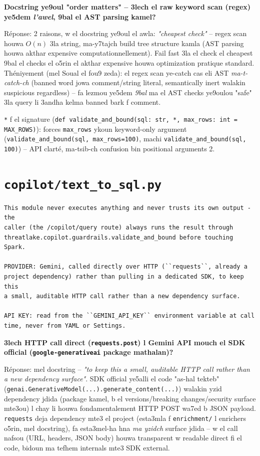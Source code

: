 \documentclass[11pt,a4paper]{report}
\DeclareRobustCommand{\code}[1]{\texttt{#1}}
\DeclareRobustCommand{\file}[1]{\texttt{\color{amber}#1}}
\begin{document}
\begin{soual}
\textbf{Docstring ye9oul "order matters" -- 3lech el raw keyword scan
(regex) ye5dem \emph{l'awel}, 9bal el AST parsing kamel?}

Réponse: 2 raisons, w el docstring ye9oul el awla: \emph{"cheapest check"}
-- regex scan houwa $O(n)$ 3la string, ma-y7tajch build tree structure
kamla (AST parsing houwa akthar expensive computationnellement). Fail
fast 3la el check el cheapest 9bal el checks el o5rin el akthar expensive
houwa optimization pratique standard. Théniyement (mel Soual el fou9
zeda): el regex scan ye-catch cas eli AST \emph{ma-t-catch-ch}
(banned word jowa comment/string literal, semantically inert walakin
suspicious regardless) -- fa lezmou ye5dem \emph{9bal} ma el AST checks
ye9oulou "safe" 3la query li 3andha kelma banned bark f comment.
\end{soual}

\code{*} f el signature (\code{def validate\_and\_bound(sql: str, *,
max\_rows: int = MAX\_ROWS)}): forces \code{max\_rows} ykoun keyword-only
argument (\code{validate\_and\_bound(sql, max\_rows=100)}, machi
\code{validate\_and\_bound(sql, 100)}) -- API clarté, ma-tsib-ch confusion
bin positional arguments 2.

\section{\file{copilot/text\_to\_sql.py}}

\begin{lstlisting}[style=pystyle]
This module never executes anything and never trusts its own output - the
caller (the /copilot/query route) always runs the result through
threatlake.copilot.guardrails.validate_and_bound before touching Spark.

PROVIDER: Gemini, called directly over HTTP (``requests``, already a
project dependency) rather than pulling in a dedicated SDK, to keep this
a small, auditable HTTP call rather than a new dependency surface.

API KEY: read from the ``GEMINI_API_KEY`` environment variable at call
time, never from YAML or Settings.
\end{lstlisting}

\begin{soual}
\textbf{3lech HTTP call direct (\code{requests.post}) l Gemini API mouch
el SDK official (\code{google-generativeai} package mathalan)?}

Réponse: mel docstring -- \emph{"to keep this a small, auditable HTTP call
rather than a new dependency surface"}. SDK official ye5alli el code
"as-hal tekteb" (\code{genai.GenerativeModel(...).generate\_content(...)})
walakin yzid dependency jdida (package kamel, b el versions/breaking
changes/security surface mte3ou) l chay li houwa fondamentalement HTTP
POST wa7ed b JSON payload. \code{requests} deja dependency mte3 el project
(esta3mla f \code{enrichment/} l enrichers o5rin, mel docstring), fa
esta3mel-ha hna \emph{ma yzidch} surface jdida -- w el call nafsou (URL,
headers, JSON body) houwa transparent w readable direct fi el code, bidoun
ma tefhem internals mte3 SDK external.
\end{soual}
\end{document}
